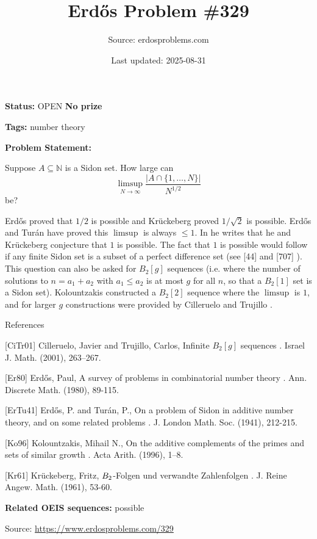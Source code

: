 \documentclass{article}
\title{Erd\H{o}s Problem \#329}
\date{Last updated: 2025-08-31}
\author{Source: erdosproblems.com}
\begin{document}
\maketitle

\noindent\textbf{Status:} OPEN \quad \textbf{No prize}

\noindent\textbf{Tags:} number theory

\medskip

\noindent\textbf{Problem Statement:}

Suppose $A\subseteq \mathbb{N}$ is a Sidon set. How large can\[\limsup_{N\to \infty}\frac{\lvert A\cap \{1,\ldots,N\}\rvert}{N^{1/2}}\]be?




Erd\H{o}s proved that $1/2$ is possible and Kr\"{u}ckeberg \cite{Kr61} proved $1/\sqrt{2}$ is possible. Erd\H{o}s and Tur\'{a}n \cite{ErTu41} have proved this $\limsup$ is always $\leq 1$. In \cite{Er80} he writes that he and Kr\"{u}ckeberg conjecture that $1$ is possible. The fact that $1$ is possible would follow if any finite Sidon set is a subset of a perfect difference set (see [44] and [707] ). This question can also be asked for $B_2[g]$ sequences (i.e. where the number of solutions to $n=a_1+a_2$ with $a_1\leq a_2$ is at most $g$ for all $n$, so that a $B_2[1]$ set is a Sidon set). Kolountzakis \cite{Ko96} constructed a $B_2[2]$ sequence where the $\limsup$ is $1$, and for larger $g$ constructions were provided by Cilleruelo and Trujillo \cite{CiTr01}.




References

[CiTr01] Cilleruelo, Javier and Trujillo, Carlos, Infinite {$B_2[g]$} sequences . Israel J. Math. (2001), 263--267.

[Er80] Erd\H{o}s, Paul, A survey of problems in combinatorial number theory . Ann. Discrete Math. (1980), 89-115.

[ErTu41] Erd\H{o}s, P. and Tur\'{a}n, P., On a problem of Sidon in additive number theory, and on some related problems . J. London Math. Soc. (1941), 212-215.

[Ko96] Kolountzakis, Mihail N., On the additive complements of the primes and sets of similar growth . Acta Arith. (1996), 1--8.

[Kr61] Kr\"{u}ckeberg, Fritz, $B\sb{2}$-Folgen und verwandte Zahlenfolgen . J. Reine Angew. Math. (1961), 53-60.

\noindent\textbf{Related OEIS sequences:} possible


\bigskip
\noindent\small{Source: \url{https://www.erdosproblems.com/329}}
\end{document}
